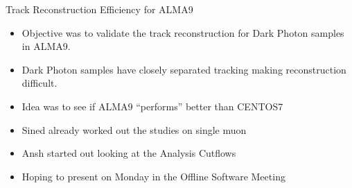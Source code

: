 \begin{frame}{Track Reconstruction Efficiency for ALMA9}
    \begin{itemize}
        \item Objective was to validate the track reconstruction for Dark Photon samples in ALMA9.
        \item Dark Photon samples have closely separated tracking making reconstruction difficult.
        \item Idea was to see if ALMA9 ``performs'' better than CENTOS7 
        \item Sined already worked out the studies on single muon 
        \item Ansh started out looking at the Analysis Cutflows
        \item Hoping to present on Monday in the Offline Software Meeting
    \end{itemize}
\end{frame}


